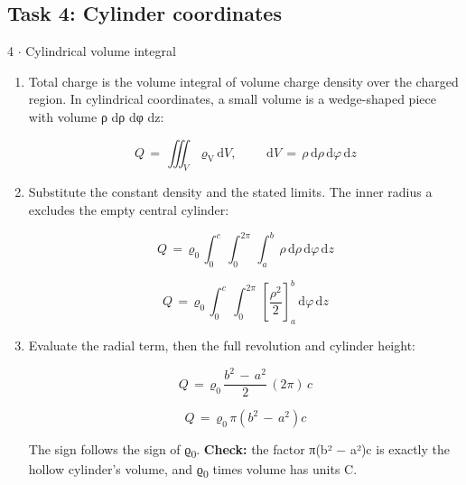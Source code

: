 \documentclass[11pt]{article}
\begin{document}
\begin{keepsection}\subsection{Task 4: Cylinder coordinates}

\begin{workedbox}{4 \ensuremath{\cdot} Cylindrical volume integral}
\begin{enumerate}
\item {}
Total charge is the volume integral of volume charge density over the charged region. In cylindrical coordinates, a small volume is a wedge-shaped piece with volume ρ dρ dφ dz:

\begin{equation*}{Q}\, =\, \iiint_{{V}} \, ϱ_{\mathrm{V}}\, \mathrm{d}{V},\quad \, \quad \, \mathrm{d}{V}\, =\, ρ\, \mathrm{d}ρ\, \mathrm{d}φ\, \mathrm{d}{z}\end{equation*}
\item {}
Substitute the constant density and the stated limits. The inner radius a excludes the empty central cylinder:

\begin{equation*}{Q}\, =\, ϱ_{0}\, \int_{0}^{{c}} \, \int_{0}^{2π} \, \int_{{a}}^{{b}} \, ρ\, \mathrm{d}ρ\, \mathrm{d}φ\, \mathrm{d}{z}\end{equation*}

\begin{equation*}{Q}\, =\, ϱ_{0}\, \int_{0}^{{c}} \, \int_{0}^{2π} \, \left[\dfrac{ρ^{2}}{2}\right]_{{a}}^{{b}}\, \mathrm{d}φ\, \mathrm{d}{z}\end{equation*}
\item {}
Evaluate the radial term, then the full revolution and cylinder height:

\begin{equation*}{Q}\, =\, ϱ_{0}\, \dfrac{{b}^{2}\, -\, {a}^{2}}{2}\, (2π)\, {c}\end{equation*}

\begin{equation*}{Q}\, =\, ϱ_{0}\, π({b}^{2}\, -\, {a}^{2}){c}\end{equation*}

The sign follows the sign of ϱ\textsubscript{0}. \textbf{Check:} the factor π(b² \ensuremath{-} a²)c is exactly the hollow cylinder’s volume, and ϱ\textsubscript{0} times volume has units C.
\end{enumerate}
\end{workedbox}

\end{keepsection}
\end{document}
